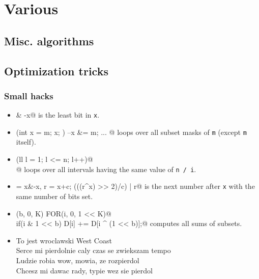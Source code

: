 \chapter{Various}

\section{Misc. algorithms}

\section{Optimization tricks}
	\subsection{Small hacks}
		\begin{itemize}
			\item \verb@x & -x@ is the least bit in \texttt{x}.
			\item \verb@for(int x = m; x; ) { --x &= m; ... }@ loops over all subset masks of \texttt{m} (except \texttt{m} itself).
			\item \verb@for(ll l = 1; l <= n; l++)@ \\ @ loops over all intervals having the same value of \texttt{n / i}.
			\item \verb@c = x&-x, r = x+c; (((r^x) >> 2)/c) | r@ is the next number after \texttt{x} with the same number of bits set.
			\item \verb@FOR(b, 0, K) FOR(i, 0, 1 << K)@ \\ \verb@  if(i & 1 << b) D[i] += D[i ^ (1 << b)];@ computes all sums of subsets.
			\item	To jest wroclawski West Coast \\
					Serce mi pierdolnie caly czas se zwiekszam tempo \\
					Ludzie robia wow, mowia, ze rozpierdol \\
					Chcesz mi dawac rady, typie wez sie pierdol
		\end{itemize}
